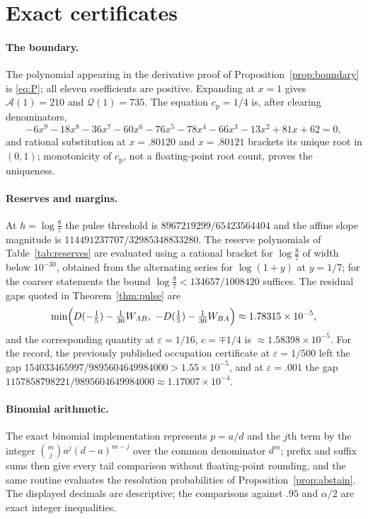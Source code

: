 \documentclass[11pt]{article}
\theoremstyle{plain}
\theoremstyle{definition}
\theoremstyle{remark}
\newcommand{\eps}{\varepsilon}
\newcommand{\cp}{c_{\mathrm p}}
\begin{document}
\appendix

\section{Exact certificates}\label{app:cert}

\paragraph{The boundary.} The polynomial appearing in the derivative proof of
Proposition~\ref{prop:boundary} is \eqref{eq:P}; all eleven coefficients are
positive. Expanding at $x=1$ gives $\mathcal A(1)=210$ and $\mathcal Q(1)=735$.
The equation $\cp=1/4$ is, after clearing denominators,
\[
 -6x^9-18x^8-36x^7-60x^6-76x^5-78x^4-66x^3-13x^2+81x+62=0 ,
\]
and rational substitution at $x=.80120$ and $x=.80121$ brackets its unique root
in $(0,1)$; monotonicity of $\cp$, not a floating-point root count, proves the
uniqueness.

\paragraph{Reserves and margins.} At $h=\log\frac87$ the pulse threshold is
$8967219299/65423564404$ and the affine slope magnitude is
$114491237707/32985348833280$. The reserve polynomials of
Table~\ref{tab:reserves} are evaluated using a rational bracket for
$\log\frac87$ of width below $10^{-30}$, obtained from the alternating series
for $\log(1+y)$ at $y=1/7$; for the coarser statements the bound
$\log\frac87<134657/1008420$ suffices. The residual gaps quoted in
Theorem~\ref{thm:pulse} are
\[
 \min\Bigl(D(-\tfrac15)-\tfrac1{30}W_{AB},\ -D(\tfrac15)-\tfrac1{30}W_{BA}\Bigr)
 \approx1.78315\times10^{-5},
\]
and the corresponding quantity at $\eps=1/16$, $c=\mp1/4$ is
$\approx1.58398\times10^{-5}$. For the record, the previously published
occupation certificate at $\eps=1/500$ left the gap
$154033465997/9895604649984000>1.55\times10^{-5}$, and at $\eps=.001$ the gap
$1157858798221/9895604649984000\approx1.17007\times10^{-4}$.

\paragraph{Binomial arithmetic.} The exact binomial implementation represents
$p=a/d$ and the $j$th term by the integer $\binom mj a^j(d-a)^{m-j}$ over the
common denominator $d^m$; prefix and suffix sums then give every tail
comparison without floating-point rounding, and the same routine evaluates the
resolution probabilities of Proposition~\ref{prop:abstain}. The displayed
decimals are descriptive; the comparisons against $.95$ and $\alpha/2$ are
exact integer inequalities.
\end{document}
